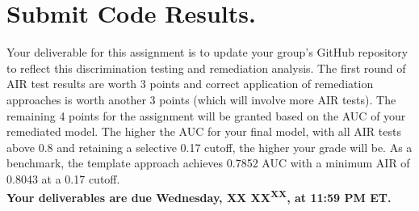 \documentclass[fleqn]{article}
\begin{document}
\section{Submit Code Results.}

Your deliverable for this assignment is to update your group's GitHub repository to reflect this discrimination testing and remediation analysis. The first round of AIR test results are worth 3 points and correct application of remediation approaches is worth another 3 points (which will involve more AIR tests). The remaining 4 points for the assignment will be granted based on the AUC of your remediated model. The higher the AUC for your final model, with all AIR tests above 0.8 and retaining a selective 0.17 cutoff, the higher your grade will be. As a benchmark, the template approach achieves 0.7852 AUC with a minimum AIR of 0.8043 at a 0.17 cutoff.\\

\noindent \textbf{Your deliverables are due Wednesday, XX XX\textsuperscript{XX}, at 11:59 PM ET.}\\
\end{document}
